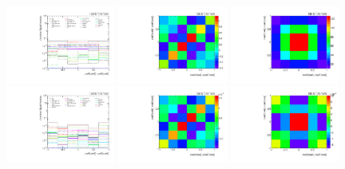 \begin{figure}[htb]
\begin{center}
 \includegraphics[width=0.32\textwidth]{fig_fullRun2UL/unfolding/combined/deltaSystCombinedlog_rebinnedB_c_Mnk.pdf}
 \includegraphics[width=0.32\textwidth]{fig_fullRun2UL/unfolding/combined/StatCovMatrix_rebinnedB_c_Mnk.pdf}
 \includegraphics[width=0.32\textwidth]{fig_fullRun2UL/unfolding/combined/TotalSystCovMatrix_rebinnedB_c_Mnk.pdf} \\
 \includegraphics[width=0.32\textwidth]{fig_fullRun2UL/unfolding/combined/deltaSystCombinedlogNorm_rebinnedB_c_Mnk.pdf}
 \includegraphics[width=0.32\textwidth]{fig_fullRun2UL/unfolding/combined/StatCovMatrixNorm_rebinnedB_c_Mnk.pdf}
 \includegraphics[width=0.32\textwidth]{fig_fullRun2UL/unfolding/combined/TotalSystCovMatrixNorm_rebinnedB_c_Mnk.pdf} \\

\end{center}
\end{figure}

